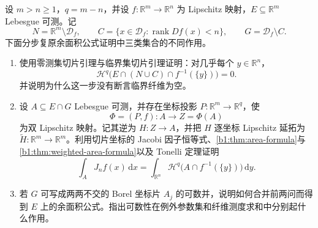\begin{exercise}\label{b1:ex:18-coarea-proof-interfaces}
设 \(m>n\geq1\)，\(q=m-n\)，并设 \(f:\mathbb R^m\rightarrow\mathbb R^n\) 为 Lipschitz 映射，\(E\subseteq\mathbb R^m\) Lebesgue 可测。记
\[
 N=\mathbb R^m\setminus\mathcal D_f,
 \qquad
 C=\{x\in\mathcal D_f:\operatorname{rank}Df(x)<n\},
 \qquad
 G=\mathcal D_f\setminus C.
\]
下面分步复原余面积公式证明中三类集合的不同作用。
\begin{enumerate}
\item\label{b1:item:18-proof-null-critical}
使用零测集切片引理与临界集切片引理证明：对几乎每个 \(y\in\mathbb R^n\)，
\[
 \mathcal H^q\bigl(E\cap(N\cup C)\cap f^{-1}(\{y\})\bigr)=0.
\]
并说明为什么这一步没有断言临界纤维为空。

\item\label{b1:item:18-proof-full-rank}
设 \(A\subseteq E\cap G\) Lebesgue 可测，并存在坐标投影 \(P:\mathbb R^m\rightarrow\mathbb R^q\)，使
\[
 \Phi=(P,f):A\longrightarrow Z=\Phi(A)
\]
为双 Lipschitz 映射。记其逆为 \(H:Z\rightarrow A\)，并把 \(H\) 逐坐标 Lipschitz 延拓为 \(\widetilde H:\mathbb R^m\rightarrow\mathbb R^m\)。利用切片坐标的 Jacobi 因子恒等式、\cref{b1:thm:area-formula}与\cref{b1:thm:weighted-area-formula}以及 Tonelli 定理证明
\[
 \int_AJ_nf(x)\,\mathrm dx
 =\int_{\mathbb R^n}
 \mathcal H^q\bigl(A\cap f^{-1}(\{y\})\bigr)\,\mathrm dy.
\]

\item\label{b1:item:18-proof-assembly}
若 \(G\) 可写成两两不交的 Borel 坐标片 \(A_j\) 的可数并，说明如何合并前两问而得到 \(E\) 上的余面积公式。指出可数性在例外参数集和纤维测度求和中分别起什么作用。
\end{enumerate}
\end{exercise}
